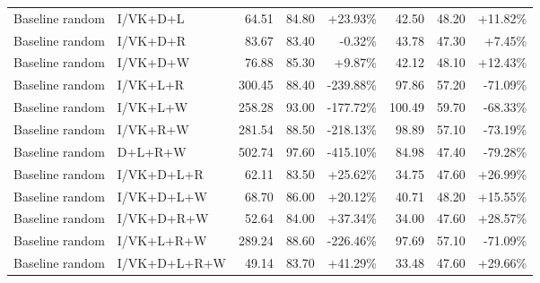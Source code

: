 \documentclass[UTF8,10pt]{ctexart}
\newcommand{\better}[1]{\textcolor{goodblue}{#1}}
\newcommand{\worse}[1]{\textcolor{badred}{#1}}
\begin{document}
{\begin{longtable}{llrrrrrr}
Baseline random & I/VK+D+L & 64.51 & 84.80 & \better{+23.93\%} & 42.50 & 48.20 & \better{+11.82\%}\\
Baseline random & I/VK+D+R & 83.67 & 83.40 & \worse{-0.32\%} & 43.78 & 47.30 & \better{+7.45\%}\\
Baseline random & I/VK+D+W & 76.88 & 85.30 & \better{+9.87\%} & 42.12 & 48.10 & \better{+12.43\%}\\
Baseline random & I/VK+L+R & 300.45 & 88.40 & \worse{-239.88\%} & 97.86 & 57.20 & \worse{-71.09\%}\\
Baseline random & I/VK+L+W & 258.28 & 93.00 & \worse{-177.72\%} & 100.49 & 59.70 & \worse{-68.33\%}\\
Baseline random & I/VK+R+W & 281.54 & 88.50 & \worse{-218.13\%} & 98.89 & 57.10 & \worse{-73.19\%}\\
Baseline random & D+L+R+W & 502.74 & 97.60 & \worse{-415.10\%} & 84.98 & 47.40 & \worse{-79.28\%}\\
Baseline random & I/VK+D+L+R & 62.11 & 83.50 & \better{+25.62\%} & 34.75 & 47.60 & \better{+26.99\%}\\
Baseline random & I/VK+D+L+W & 68.70 & 86.00 & \better{+20.12\%} & 40.71 & 48.20 & \better{+15.55\%}\\
Baseline random & I/VK+D+R+W & 52.64 & 84.00 & \better{+37.34\%} & 34.00 & 47.60 & \better{+28.57\%}\\
Baseline random & I/VK+L+R+W & 289.24 & 88.60 & \worse{-226.46\%} & 97.69 & 57.10 & \worse{-71.09\%}\\
Baseline random & I/VK+D+L+R+W & 49.14 & 83.70 & \better{+41.29\%} & 33.48 & 47.60 & \better{+29.66\%}\\


\end{longtable}}
\end{document}
